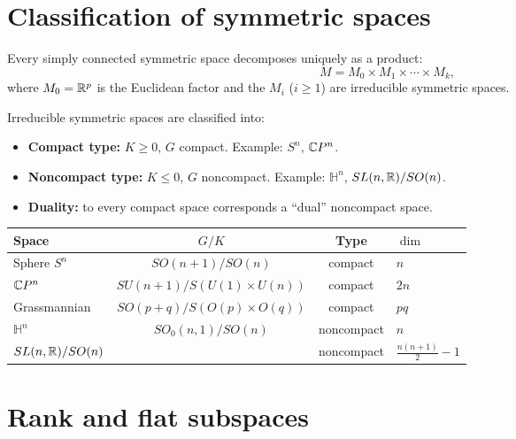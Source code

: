 \section{Classification of symmetric spaces}

\begin{theorem}
Every simply connected symmetric space decomposes uniquely as a product:
\[
    M = M_0 \times M_1 \times \cdots \times M_k,
\]
where $M_0 = \mathbb{R}^p$ is the Euclidean factor and the $M_i$ ($i \geq 1$) are
irreducible symmetric spaces.
\end{theorem}

\begin{definition}
Irreducible symmetric spaces are classified into:
\begin{itemize}
    \item \textbf{Compact type:} $K \geq 0$, $G$ compact. Example: $S^n$, $\mathbb{C} P^n$.
    \item \textbf{Noncompact type:} $K \leq 0$, $G$ noncompact.
          Example: $\mathbb{H}^n$, $SL(n,\mathbb{R})/SO(n)$.
    \item \textbf{Duality:} to every compact space corresponds a ``dual'' noncompact
          space.
\end{itemize}
\end{definition}

\begin{keyformulas}[title=\textbf{Examples of irreducible symmetric spaces}]
\begin{center}
\renewcommand{\arraystretch}{1.3}
\begin{tabular}{lccl}
\hline
\textbf{Space} & $G/K$ & \textbf{Type} & $\dim$ \\
\hline
Sphere $S^n$ & $SO(n+1)/SO(n)$ & compact & $n$ \\
$\mathbb{C} P^n$ & $SU(n+1)/S(U(1) \times U(n))$ & compact & $2n$ \\
Grassmannian & $SO(p+q)/S(O(p) \times O(q))$ & compact & $pq$ \\
$\mathbb{H}^n$ & $SO_0(n,1)/SO(n)$ & noncompact & $n$ \\
$SL(n,\mathbb{R})/SO(n)$ & & noncompact & $\frac{n(n+1)}{2}-1$ \\
\hline
\end{tabular}
\end{center}
\end{keyformulas}

\section{Rank and flat subspaces}

